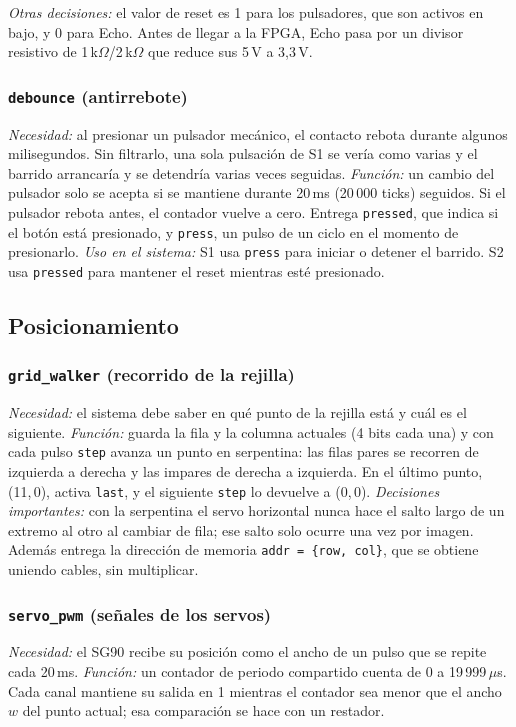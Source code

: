 \documentclass[conference]{IEEEtran}
\newcommand{\mo}[1]{\texttt{#1}}
\newcommand{\us}{\,$\mu$s}
\begin{document}
\emph{Otras decisiones:} el valor de reset es 1 para los pulsadores, que son activos en bajo, y 0 para Echo. Antes de llegar a la FPGA, Echo pasa por un divisor resistivo de 1\,k$\Omega$/2\,k$\Omega$ que reduce sus 5\,V a 3,3\,V.

\subsubsection{\mo{debounce} (antirrebote)}
\emph{Necesidad:} al presionar un pulsador mecánico, el contacto rebota durante algunos milisegundos. Sin filtrarlo, una sola pulsación de S1 se vería como varias y el barrido arrancaría y se detendría varias veces seguidas.
\emph{Función:} un cambio del pulsador solo se acepta si se mantiene durante 20\,ms (20\,000 ticks) seguidos. Si el pulsador rebota antes, el contador vuelve a cero. Entrega \mo{pressed}, que indica si el botón está presionado, y \mo{press}, un pulso de un ciclo en el momento de presionarlo.
\emph{Uso en el sistema:} S1 usa \mo{press} para iniciar o detener el barrido. S2 usa \mo{pressed} para mantener el reset mientras esté presionado.

\subsection{Posicionamiento}

\subsubsection{\mo{grid\_walker} (recorrido de la rejilla)}
\emph{Necesidad:} el sistema debe saber en qué punto de la rejilla está y cuál es el siguiente.
\emph{Función:} guarda la fila y la columna actuales (4 bits cada una) y con cada pulso \mo{step} avanza un punto en serpentina: las filas pares se recorren de izquierda a derecha y las impares de derecha a izquierda. En el último punto, (11,\,0), activa \mo{last}, y el siguiente \mo{step} lo devuelve a (0,\,0).
\emph{Decisiones importantes:} con la serpentina el servo horizontal nunca hace el salto largo de un extremo al otro al cambiar de fila; ese salto solo ocurre una vez por imagen. Además entrega la dirección de memoria \mo{addr = \{row, col\}}, que se obtiene uniendo cables, sin multiplicar.

\subsubsection{\mo{servo\_pwm} (señales de los servos)}
\emph{Necesidad:} el SG90 recibe su posición como el ancho de un pulso que se repite cada 20\,ms.
\emph{Función:} un contador de periodo compartido cuenta de 0 a 19\,999\us. Cada canal mantiene su salida en 1 mientras el contador sea menor que el ancho $w$ del punto actual; esa comparación se hace con un restador.
\end{document}
